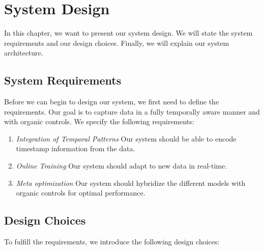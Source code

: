 \chapter{System Design}

In this chapter, we want to present our system design. We will state the system requirements and our design choices. Finally, we will explain our system architecture. 

\section{System Requirements}
Before we can begin to design our system, we first need to define the requirements. Our goal is to capture data in a fully temporally aware manner and with organic controls. We specify the following requirements:

\begin{enumerate}
    \item \emph{Integration of Temporal Patterns} Our system should be able to encode timestamp information from the data.
    
    \item \emph{Online Training} Our system should adapt to new data in real-time. 
    
    \item \emph{Meta optimization} Our system should hybridize the different models with organic controls for optimal performance. 
\end{enumerate}


\section{Design Choices}
To fulfill the requirements, we introduce the following design choices:

